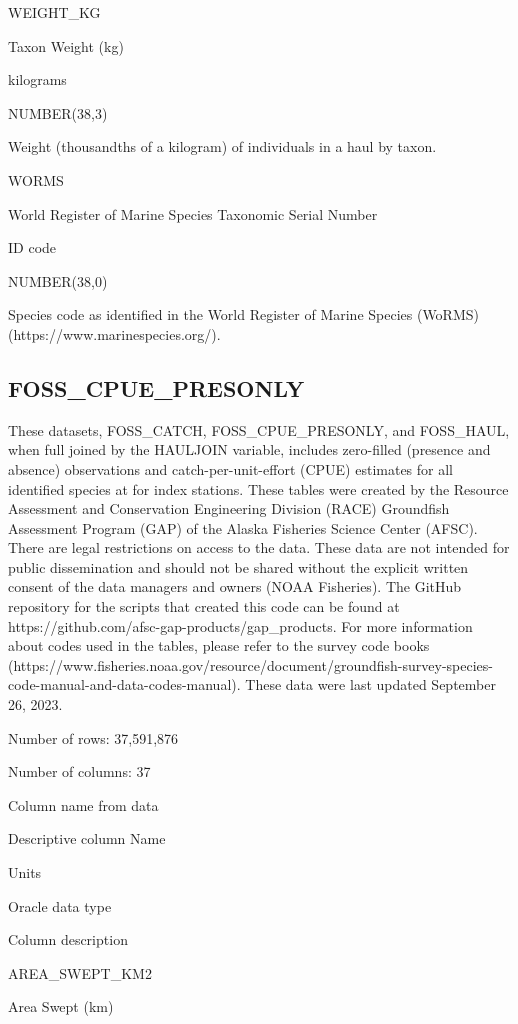 \documentclass[
  letterpaper,
  oneside,
  open=any]{scrbook}
\begin{document}
WEIGHT\_KG

Taxon Weight (kg)

kilograms

NUMBER(38,3)

Weight (thousandths of a kilogram) of individuals in a haul by taxon.

WORMS

World Register of Marine Species Taxonomic Serial Number

ID code

NUMBER(38,0)

Species code as identified in the World Register of Marine Species
(WoRMS) (https://www.marinespecies.org/).

\hypertarget{foss_cpue_presonly}{%
\subsection{FOSS\_CPUE\_PRESONLY}\label{foss_cpue_presonly}}

These datasets, FOSS\_CATCH, FOSS\_CPUE\_PRESONLY, and FOSS\_HAUL, when
full joined by the HAULJOIN variable, includes zero-filled (presence and
absence) observations and catch-per-unit-effort (CPUE) estimates for all
identified species at for index stations. These tables were created by
the Resource Assessment and Conservation Engineering Division (RACE)
Groundfish Assessment Program (GAP) of the Alaska Fisheries Science
Center (AFSC). There are legal restrictions on access to the data. These
data are not intended for public dissemination and should not be shared
without the explicit written consent of the data managers and owners
(NOAA Fisheries). The GitHub repository for the scripts that created
this code can be found at
https://github.com/afsc-gap-products/gap\_products. For more information
about codes used in the tables, please refer to the survey code books
(https://www.fisheries.noaa.gov/resource/document/groundfish-survey-species-code-manual-and-data-codes-manual).
These data were last updated September 26, 2023.

Number of rows: 37,591,876

Number of columns: 37

Column name from data

Descriptive column Name

Units

Oracle data type

Column description

AREA\_SWEPT\_KM2

Area Swept (km)
\end{document}
